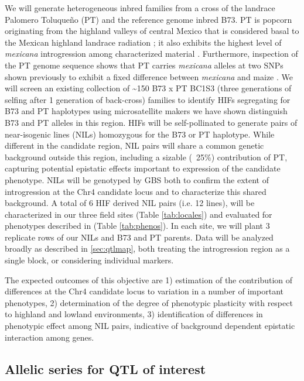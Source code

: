 We will generate heterogeneous inbred families \citep[HIFS;][]{tuinstra1997heterogeneous} from a cross of the landrace Palomero Toluque\~no (PT) and the reference genome inbred B73.  PT is popcorn originating from the highland valleys of central Mexico that is considered basal to the Mexican highland landrace radiation \citep{reif2006grouping}; it also exhibits the highest level of \emph{mexicana} introgression among characterized material \citep{Matsuoka2002}. Furthermore, inspection of the PT genome sequence \citep{Vielle-Calzada2009} shows that PT carries \emph{mexicana} alleles at two SNPs shown previously to exhibit a fixed difference between  \emph{mexicana} and maize \citep{Hufford2013}. We will screen an existing collection of \textasciitilde 150 B73 x PT BC1S3 (three generations of selfing after 1 generation of back-cross) families to identify HIFs segregating for B73 and PT haplotypes using microsatellite makers we have shown distinguish B73 and PT alleles in this region. HIFs will be self-pollinated to generate pairs of near-isogenic lines (NILs) homozygous for the B73 or PT haplotype. While different in the candidate region, NIL pairs will share a common genetic background outside this region, including a sizable (~25\%) contribution of PT, capturing potential epistatic effects important to expression of the candidate phenotype. NILs will be genotyped by GBS  \citep{Elshire 2011, Glaubitz2014} both to confirm the extent of introgression at the Chr4 candidate locus and to characterize this shared background. A total of 6 HIF derived NIL pairs (i.e. 12 lines), will be characterized in our three field sites (Table \ref{tab:locales}) and evaluated for phenotypes described in (Table \ref{tab:phenos}). In each site, we will plant 3 replicate rows of our NILs and B73 and PT parents. Data will be analyzed broadly as described in \ref{sec:qtlmap}, both treating the introgression region as a single block, or considering individual markers.

The expected outcomes of this objective are 1) estimation of the contribution of differences at the Chr4 candidate locus to variation in a number of important phenotypes, 2) determination of the degree of phenotypic plasticity with respect to highland and lowland environments, 3) identification of differences in phenotypic effect among NIL pairs, indicative of background dependent epistatic interaction among genes.

\subsection{Allelic series for QTL of interest} \label{subsec:series}

